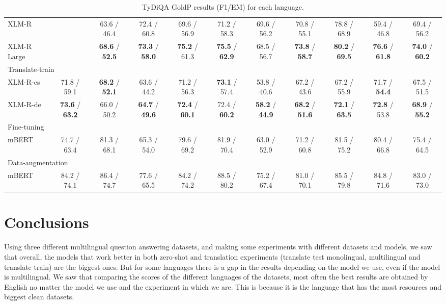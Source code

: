 \documentclass[11pt]{article}
\begin{document}
\begin{table*}[!ht]
\begin{adjustbox}{max width=\textwidth}
\begin{tabular}{l|ccccccccc|c}
        XLM-R & ~ & 63.6 / 46.4 & 72.4 / 60.8 & 69.6 / 56.9 & 71.2 / 58.3 & 69.6 / 56.2 & 70.8 / 55.1 & 78.8 / 68.9 & 59.4 / 46.8 & 69.4 / 56.2 \\
        XLM-R Large & ~ & \textbf{68.6} / \textbf{52.5} & \textbf{73.3} / \textbf{58.0} & \textbf{75.2} / 61.3 & \textbf{75.5} / \textbf{62.9} & 68.5 / 56.7 & \textbf{73.8} / \textbf{58.7} & \textbf{80.2} / \textbf{69.5} & \textbf{76.6} / \textbf{61.8} & \textbf{74.0} / \textbf{60.2}\\
        \midrule
        \multicolumn{11}{l}{Translate-train} \\
        \midrule
        XLM-R-es & 71.8 / 59.1 & \textbf{68.2} / \textbf{52.1} & 63.6 / 44.2 & 71.2 / 56.3 & \textbf{73.1} / 57.4 & 53.8 / 40.6 & 67.2 / 43.6 & 67.2 / 55.9 & 71.7 / \textbf{54.4} & 67.5 / 51.5 \\
        XLM-R-de & \textbf{73.6} / \textbf{63.2} & 66.0 / 50.2 & \textbf{64.7} / \textbf{49.6} & \textbf{72.4} / \textbf{60.1} & 72.4 / \textbf{60.2} & \textbf{58.2} / \textbf{44.9} & \textbf{68.2} / \textbf{51.6} & \textbf{72.1} / \textbf{63.5} & \textbf{72.8} / 53.8 & \textbf{68.9} / \textbf{55.2} \\
        \midrule
        \multicolumn{11}{l}{Fine-tuning} \\
        \midrule
        mBERT & 74.7 / 63.4 & 81.3 / 68.1 & 65.3 / 54.0 & 79.6 / 69.2 & 81.9 / 70.4 & 63.0 / 52.9 & 71.2 / 60.8 & 81.5 / 75.2 & 80.4 / 66.8 & 75.4 / 64.5  \\
        \midrule
        \multicolumn{11}{l}{Data-augmentation} \\
        \midrule
        mBERT & 84.2 / 74.1 & 86.4 / 74.7 & 77.6 / 65.5 & 84.2 / 74.2 & 88.5 / 80.2 & 75.2 / 67.4 & 81.0 / 70.1 & 85.5 / 79.8 & 84.8 / 71.6 & 83.0 / 73.0 \\
        \bottomrule
    \end{tabular}
    \end{adjustbox}
    \centering
    \caption{TyDiQA GoldP results (F1/EM) for each language.}
    \label{TyDiQA_results}
\end{table*}


\section{Conclusions}

Using three different multilingual question answering datasets, and making some experiments with different datasets and models, we saw that overall, the models that work better in both zero-shot and translation experiments (translate test monolingual, multilingual and translate train) are the biggest ones. But for some languages there is a gap in the results depending on the model we use, even if the model is multilingual. We saw that comparing the scores of the different languages of the datasets, most often the best results are obtained by English no matter the model we use and the experiment in which we are. This is because it is the language that has the most resources and biggest clean datasets.
\end{document}
